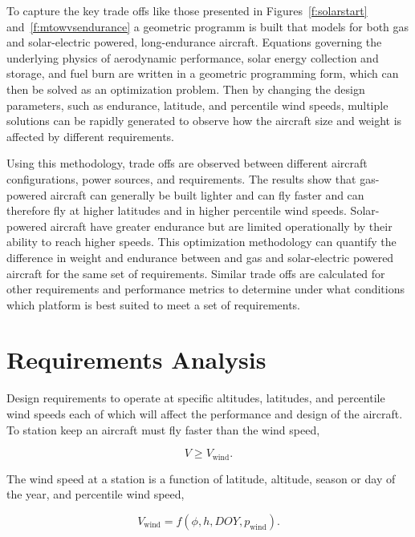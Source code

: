 \documentclass[]{aiaa-tc}%
\begin{document}
To capture the key trade offs like those presented in Figures~\ref{f:solarstart} and~\ref{f:mtowvsendurance} a geometric programm is built that models for both gas and solar-electric powered, long-endurance aircraft.  
Equations governing the underlying physics of aerodynamic performance, solar energy collection and storage, and fuel burn are written in a geometric programming form, which can then be solved as an optimization problem.
Then by changing the design parameters, such as endurance, latitude, and percentile wind speeds, multiple solutions can be rapidly generated to observe how the aircraft size and weight is affected by different requirements. 

Using this methodology, trade offs are observed between different aircraft configurations, power sources, and requirements.  
The results show that gas-powered aircraft can generally be built lighter and can fly faster and can therefore fly at higher latitudes and in higher percentile wind speeds.  
Solar-powered aircraft have greater endurance but are limited operationally by their ability to reach higher speeds.  
This optimization methodology can quantify the difference in weight and endurance between and gas and solar-electric powered aircraft for the same set of requirements. 
Similar trade offs are calculated for other requirements and performance metrics to determine under what conditions which platform is best suited to meet a set of requirements.

\section{Requirements Analysis}

Design requirements to operate at specific altitudes, latitudes, and percentile wind speeds each of which will affect the performance and design of the aircraft.\cite{zephyr} 
To station keep an aircraft must fly faster than the wind speed,

\begin{equation}
    \label{e:availreq}
    V \geq V_{\text{wind}}.
\end{equation}

The wind speed at a station is a function of latitude, altitude, season or day of the year, and percentile wind speed,

\begin{equation}
    \label{e:windspeed}
    V_{\text{wind}} = f(\phi, h, DOY, p_{\text{wind}}).
    \end{equation}
\end{document}
